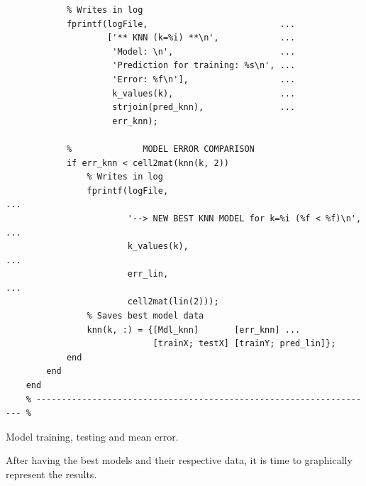 \documentclass[11pt]{article}
\begin{document}
\begin{listing}
\begin{verbatim}
            % Writes in log
            fprintf(logFile,                          ...
                    ['** KNN (k=%i) **\n',            ...
                     'Model: \n',                     ...
                     'Prediction for training: %s\n', ...
                     'Error: %f\n'],                  ...
                     k_values(k),                     ...
                     strjoin(pred_knn),               ...
                     err_knn);
            
            %              MODEL ERROR COMPARISON
            if err_knn < cell2mat(knn(k, 2))
                % Writes in log
                fprintf(logFile,                                       ...
                        '--> NEW BEST KNN MODEL for k=%i (%f < %f)\n', ...
                        k_values(k),                                   ...
                        err_lin,                                       ...
                        cell2mat(lin(2)));
                % Saves best model data
                knn(k, :) = {[Mdl_knn]       [err_knn] ...
                             [trainX; testX] [trainY; pred_lin]};
            end
        end
    end
    % ------------------------------------------------------------------- %
\end{verbatim}
\caption{Model training, testing and mean error.}
\label{mdls}
\end{listing}

After having the best models and their respective data, it is time to
graphically represent the results.
\end{document}
